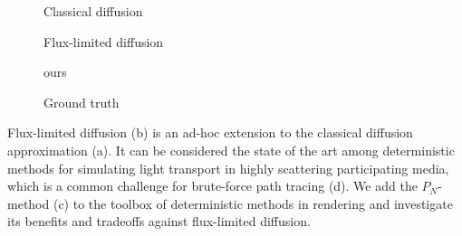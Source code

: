 \teaser
{
\centering
\begin{subfigure}{0.2\linewidth}
\missingfigure{}
\vspace{-0.17in}
\caption{Classical diffusion}
\end{subfigure}%
\hspace{0.05\linewidth}
\begin{subfigure}{0.2\linewidth}
\missingfigure{}
\vspace{-0.17in}
\caption{Flux-limited diffusion}
\end{subfigure}%
\hspace{0.05\linewidth}
\begin{subfigure}{0.2\linewidth}
\missingfigure{}
\vspace{-0.17in}
\caption{ours}
\label{fig:nebulae_ours}
\end{subfigure}%
\hspace{0.05\linewidth}
\begin{subfigure}{0.2\linewidth}
\missingfigure{}
\vspace{-0.17in}
\caption{Ground truth}
\end{subfigure}%
\vspace{-0.1in}
\icaption
{
Flux-limited diffusion (b) is an ad-hoc extension to the classical diffusion approximation (a). It can be considered the state of the art among deterministic methods for simulating light transport in highly scattering participating media, which is a common challenge for brute-force path tracing (d). We add the $P_N$-method (c) to the toolbox of deterministic methods in rendering and investigate its benefits and tradeoffs against flux-limited diffusion.
}
\label{fig:teaser}
}

\maketitle




